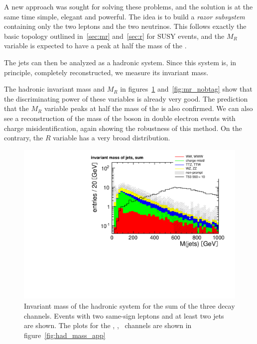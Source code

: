 A new approach was sought for solving these problems, and the solution is at
the same time simple, elegant and powerful.
The idea is to build a \emph{razor subsystem} containing only the two
leptons and the two neutrinos. This follows exactly the basic topology
outlined in~\ref{sec:mr} and~\ref{sec:r} for SUSY events, and the $M_R$
variable is expected to have a peak at half the mass of the \TP.

The jets can then be analyzed as a hadronic system. Since this system is, in
principle, completely reconstructed, we measure its invariant mass.

The hadronic invariant mass and $M_R$ in figures~\ref{fig:had_mass}
and~\ref{fig:mr_nobtag} show that the discriminating power of these
variables is already very good. The prediction that the $M_R$ variable peaks
at half the mass of the \TP is also confirmed. We can also see a
reconstruction of the mass of the \Z boson in double electron events with
charge misidentification, again showing the robustness of this method.
On the contrary, the $R$ variable has a very
broad distribution.

\begin{figure}[htb]
    \centering
    \includegraphics[width=\textwidth]{images/pdf/had_mass_sum_0}
    \caption{Invariant mass of the hadronic system for the sum of the three decay channels. Events with two same-sign leptons and at least
two jets are shown. The plots for the \E\E, \E\M, \M\M\ channels are
shown in figure~\ref{fig:had_mass_app}}
    \label{fig:had_mass}
\end{figure}

